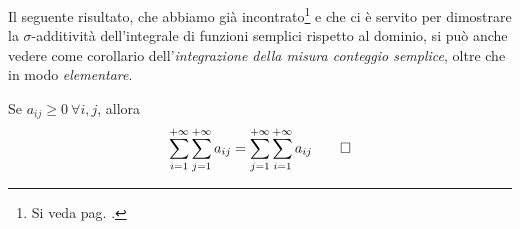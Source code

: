 Il seguente risultato, che abbiamo già incontrato\footnote{Si veda pag. \pageref{commutativitàindici}.} e che ci è servito per dimostrare la $\sigma$-additività dell'integrale di funzioni semplici rispetto al dominio, si può anche vedere come corollario dell'\textit{integrazione della misura conteggio semplice}, oltre che in modo \textit{elementare}. 
\begin{corollaryqed}
	Se $a_{ij}\geq0\ \forall i,j$, allora
	\begin{equation*}
		\sum_{i=1}^{+\infty}\sum_{j=1}^{+\infty}a_{ij}=\sum_{j=1}^{+\infty}\sum_{i=1}^{+\infty}a_{ij}\qedhere
	\end{equation*}
\end{corollaryqed}
